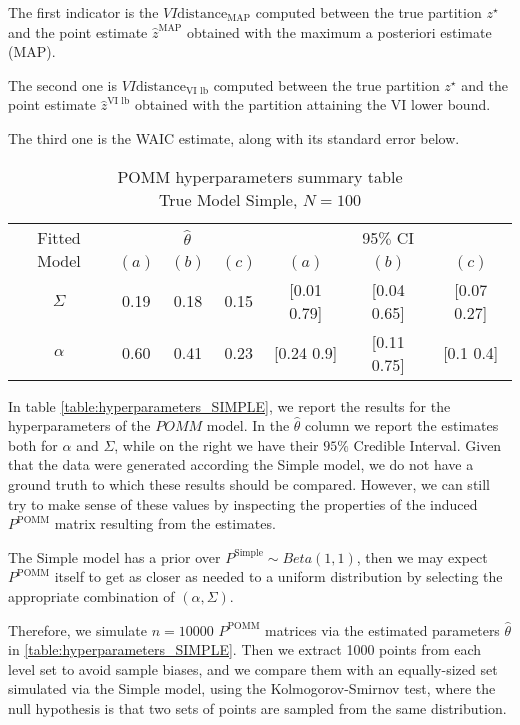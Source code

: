 \documentclass[11pt]{amsart}
\begin{document}
The first indicator is the $VI \text{distance}_{\text{MAP}}$ computed between the true partition $z^\star$ and the point estimate $\hat{z}^{\text{MAP}}$ obtained with the maximum a posteriori estimate (MAP).

The second one is $VI \text{distance}_{\text{VI lb}}$ computed between the true partition $z^\star$ and the point estimate $\hat{z}^{\text{VI lb}}$ obtained with the partition attaining the VI lower bound.

The third one is the WAIC estimate, along with its standard error below.



\begin{table}[htbp]
\centering
\caption{
{\large POMM hyperparameters summary table} \\ 
{\small True Model Simple, $N=100$}
} 
\begin{tabular}{ccccccc}
\toprule
\multirow{2}{*}{Fitted Model} & \multicolumn{3}{c}{
$\hat{\theta}$} & \multicolumn{3}{c}{95$\%$ CI} \\
\cmidrule(lr){2-4} \cmidrule(lr){5-7} 
& $(a)$ & $(b)$ & $(c)$ & $(a)$ & $(b)$ & $(c)$  \\
\midrule
$\Sigma$  & 0.19 & 0.18 & 0.15 & [0.01	0.79] & [0.04	0.65] & [0.07	0.27]   \\
$\alpha$ & 0.60 & 0.41 & 0.23 & [0.24	0.9] & [0.11	0.75] & [0.1	0.4] \\
\bottomrule
\end{tabular}
\label{table:hyperparameters_SIMPLE}
\end{table}


In table \eqref{table:hyperparameters_SIMPLE}, we report the results for the hyperparameters of the $POMM$ model. In the $\hat{\theta}$ column we report the estimates both for $\alpha$ and $\Sigma$, while on the right we have their $95\%$ Credible Interval.
Given that the data were generated according the Simple model, we do not have a ground truth to which these results should be compared. However, we can still try to make sense of these values by inspecting the properties of the induced $P^{\text{POMM}}$ matrix resulting from the estimates.

The Simple model has a prior over $P^{\text{Simple}} \sim Beta(1,1)$, then we may expect $P^{\text{POMM}}$ itself to get as closer as needed to a uniform distribution by selecting the appropriate combination of $(\alpha, \Sigma)$. 

Therefore, we simulate $n=10000$ $P^{\text{POMM}}$ matrices via the estimated parameters $\hat{\theta}$ in \eqref{table:hyperparameters_SIMPLE}. Then we extract 1000 points from each level set to avoid sample biases, and we compare them with an equally-sized set simulated via the Simple model, using the Kolmogorov-Smirnov test, where the null hypothesis is that two sets of points are sampled from the same distribution.
\end{document}
